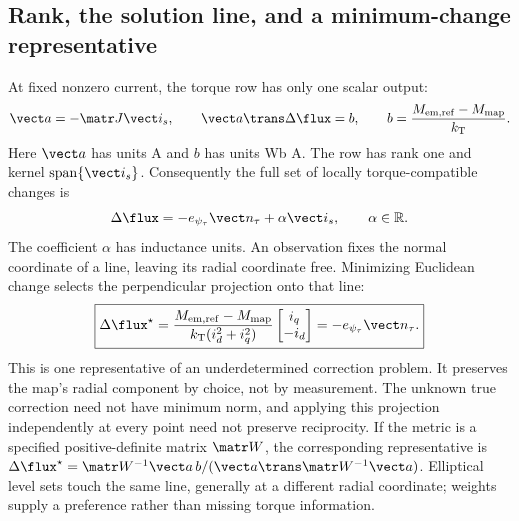 \subsection{Rank, the solution line, and a minimum-change representative}
At fixed nonzero current, the torque row has only one scalar output:
\begin{equation}
 \vect a=-\matr J\vect i_s,\qquad
 \vect a\trans\Delta\flux=b,\qquad
 b=\frac{M_{\rm em,ref}-M_{\rm map}}{k_{\rm T}} .
 \label{eq:torque-row}
\end{equation}
Here $\vect a$ has units A and $b$ has units Wb A.
The row has rank one and kernel $\operatorname{span}\{\vect i_s\}$.
Consequently the full set of locally torque-compatible changes is
\begin{equation}
 \Delta\flux=-e_{\psi_\tau}\vect n_\tau+\alpha\vect i_s,\qquad
 \alpha\in\mathbb R .
 \label{eq:torque-family}
\end{equation}
The coefficient $\alpha$ has inductance units. An observation fixes the
normal coordinate of a line, leaving its radial coordinate free.
Minimizing Euclidean change selects the perpendicular projection onto
that line:
\begin{equation}
 \boxed{\Delta\flux^\star
 =\frac{M_{\rm em,ref}-M_{\rm map}}{k_{\rm T}(i_d^2+i_q^2)}
       \begin{bmatrix}i_q\\-i_d\end{bmatrix}
 =-e_{\psi_\tau}\vect n_\tau .}
 \label{eq:torque-minimum}
\end{equation}
This is one representative of an underdetermined correction problem.
It preserves the map's radial component by choice, not by measurement.
The unknown true correction need not have minimum norm, and applying this
projection independently at every point need not preserve reciprocity.
If the metric is a specified positive-definite matrix $\matr W$,
the corresponding representative is
$\Delta\flux^\star=\matr W^{-1}\vect a\,b/
(\vect a\trans\matr W^{-1}\vect a)$. Elliptical level sets touch the same
line, generally at a different radial coordinate; weights supply a
preference rather than missing torque information.

